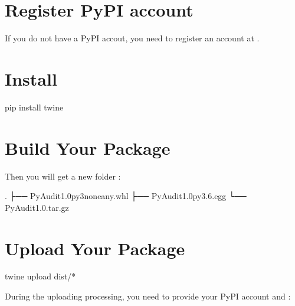 \documentclass[letterpaper,12pt,english]{sphinxmanual}
\begin{document}
\section{Register PyPI account}
\label{\detokenize{pypi:register-pypi-account}}
\sphinxAtStartPar
If you do not have a PyPI accout, you need to register an account at  .


\section{Install }
\label{\detokenize{pypi:install-twine}}
\begin{sphinxVerbatim}[commandchars=\\\{\}]
pip install twine
\end{sphinxVerbatim}


\section{Build Your Package}
\label{\detokenize{pypi:build-your-package}}
\begin{sphinxVerbatim}[commandchars=\\\{\}]
   
\end{sphinxVerbatim}

\sphinxAtStartPar
Then you will get a new folder :

\begin{sphinxVerbatim}[commandchars=\\\{\}]
.
├── PyAudit\PYGZhy{}1.0\PYGZhy{}py3\PYGZhy{}none\PYGZhy{}any.whl
├── PyAudit\PYGZhy{}1.0\PYGZhy{}py3.6.egg
└── PyAudit\PYGZhy{}1.0.tar.gz
\end{sphinxVerbatim}


\section{Upload Your Package}
\label{\detokenize{pypi:upload-your-package}}
\begin{sphinxVerbatim}[commandchars=\\\{\}]
twine upload dist/*
\end{sphinxVerbatim}

\sphinxAtStartPar
During the uploading processing, you need to provide your PyPI account  and :
\end{document}
